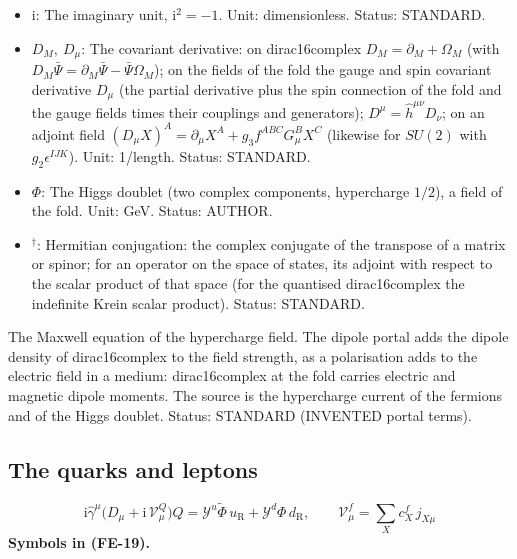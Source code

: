 \documentclass[
  10pt,
]{article}
\begin{document}
\begin{itemize}
  matrices of the fold: \(\hat\gamma^{(a)}\) along the frame directions
  of the fold and \(\hat\gamma^\mu\) along its coordinates (the frame
  matrices contracted with the inverse frame field of the fold),
  \(\{\hat\gamma^\mu, \hat\gamma^\nu\} = -2\hat h^{\mu\nu}\mathbf{1}\);
  \(\hat\gamma_\mu = \hat h_{\mu\nu}\hat\gamma^\nu\). Unit:
  dimensionless. Status: STANDARD.
\item
  \(\mathrm{i}\): The imaginary unit, \(\mathrm{i}^2 = -1\). Unit:
  dimensionless. Status: STANDARD.
\item
  \(D_M,\ D_\mu\): The covariant derivative: on dirac16complex
  \(D_M = \partial_M + \Omega_M\) (with
  \(D_M\bar\Psi = \partial_M\bar\Psi - \bar\Psi\Omega_M\)); on the
  fields of the fold the gauge and spin covariant derivative \(D_\mu\)
  (the partial derivative plus the spin connection of the fold and the
  gauge fields times their couplings and generators);
  \(D^\mu = \hat h^{\mu\nu}D_\nu\); on an adjoint field
  \((D_\mu X)^A = \partial_\mu X^A + g_3f^{ABC}G^B_\mu X^C\) (likewise
  for \(SU(2)\) with \(g_2\epsilon^{IJK}\)). Unit: 1/length. Status:
  STANDARD.
\item
  \(\Phi\): The Higgs doublet (two complex components, hypercharge
  \(1/2\)), a field of the fold. Unit: GeV. Status: AUTHOR.
\item
  \({}^\dagger\): Hermitian conjugation: the complex conjugate of the
  transpose of a matrix or spinor; for an operator on the space of
  states, its adjoint with respect to the scalar product of that space
  (for the quantised dirac16complex the indefinite Krein scalar
  product). Status: STANDARD.
\end{itemize}

The Maxwell equation of the hypercharge field. The dipole portal adds
the dipole density of dirac16complex to the field strength, as a
polarisation adds to the electric field in a medium: dirac16complex at
the fold carries electric and magnetic dipole moments. The source is the
hypercharge current of the fermions and of the Higgs doublet. Status:
STANDARD (INVENTED portal terms).

\hypertarget{the-quarks-and-leptons-1}{%
\subsection{The quarks and leptons}\label{the-quarks-and-leptons-1}}

\[
\mathrm{i}\hat\gamma^\mu\big(D_\mu + \mathrm{i}\,\mathcal{V}^{Q}_\mu\big)Q = \mathcal{Y}^{u}\tilde\Phi\,u_{\mathrm{R}}
 + \mathcal{Y}^{d}\Phi\,d_{\mathrm{R}},\qquad \mathcal{V}^{f}_\mu = \sum_X c^{f}_X\,j_{X\mu} \tag{FE-19}
\] \textbf{Symbols in (FE-19).}
\end{document}
